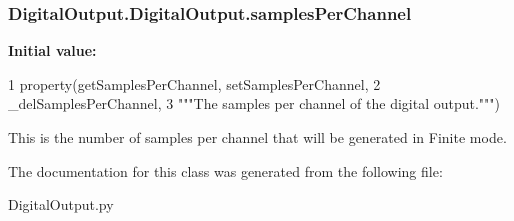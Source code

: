 \hypertarget{class_digital_output_1_1_digital_output_a8de6ce12b96449fe3546d29d67bf1308}{
\subsubsection[{samples\-Per\-Channel}]{\setlength{\rightskip}{0pt plus 5cm}Digital\-Output.\-Digital\-Output.\-samples\-Per\-Channel\hspace{0.3cm}{\ttfamily [static]}}}\label{class_digital_output_1_1_digital_output_a8de6ce12b96449fe3546d29d67bf1308}
{\bfseries Initial value\-:}
\begin{DoxyCode}
1 property(getSamplesPerChannel, setSamplesPerChannel,
2             \_delSamplesPerChannel,
3             \textcolor{stringliteral}{"""The samples per channel of the digital output."""})
\end{DoxyCode}


This is the number of samples per channel that will be generated in Finite mode. 



The documentation for this class was generated from the following file\-:\begin{DoxyCompactItemize}
\item 
Digital\-Output.\-py\end{DoxyCompactItemize}
